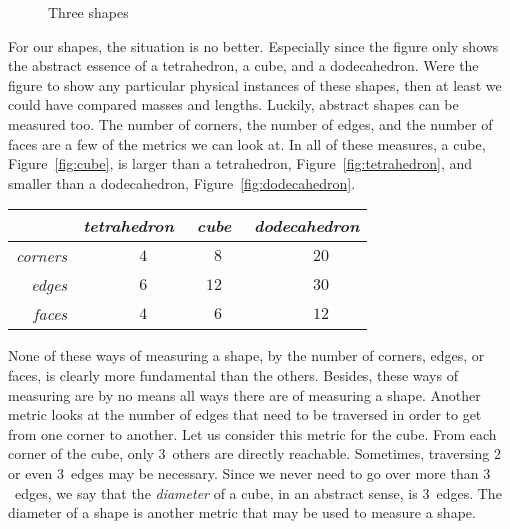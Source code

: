 \begin{figure}[bp]
{
  }
  \caption{
    Three shapes
  }
  \label{fig:shapes}
\end{figure}

For our shapes, the situation is no better.
Especially since the figure only shows the abstract essence of a tetrahedron, a cube, and a dodecahedron.
Were the figure to show any particular physical instances of these shapes, then at least we could have compared masses and lengths.
Luckily, abstract shapes can be measured too.
The number of corners, the number of edges, and the number of faces are a few of the metrics we can look at.
In all of these measures, a cube, Figure~\ref{fig:cube}, is larger than a tetrahedron, Figure~\ref{fig:tetrahedron}, and smaller than a dodecahedron, Figure~\ref{fig:dodecahedron}.
\begin{center}
  \begin{tabular}{r|p{2em}rp{1em}p{2em}rp{1em}p{2em}rp{1em}}
    &	\multicolumn{3}{c}{\emph{tetrahedron}}	& \multicolumn{3}{c}{\emph{cube}}	& \multicolumn{3}{c}{\emph{dodecahedron}} \\
    \hline
    \emph{corners}	&& $4$	&&& $8$	&&& $20$ \\
    \emph{edges}	&& $\phantom{0}6$	&&& $12$	&&& $30$	& \hspace{0pt} \\
    \emph{faces}	&& $4$	&&& $6$	&&& $12$
  \end{tabular}
\end{center}

None of these ways of measuring a shape, by the number of corners, edges, or faces, is clearly more fundamental than the others.
Besides, these ways of measuring are by no means all ways there are of measuring a shape.
Another metric looks at the number of edges that need to be traversed in order to get from one corner to another.
Let us consider this metric for the cube.
From each corner of the cube, only $3$~others are directly reachable.
Sometimes, traversing $2$ or even $3$~edges may be necessary.
Since we never need to go over more than $3$~edges, we say that the \emph{diameter} of a cube, in an abstract sense, is $3$~edges.
The diameter of a shape is another metric that may be used to measure a shape.

